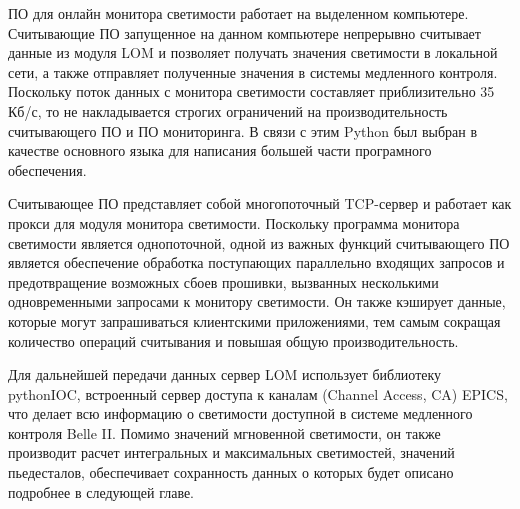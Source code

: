   ПО для онлайн монитора светимости работает на выделенном компьютере. Считывающие ПО запущенное на данном компьютере непрерывно считывает данные из модуля LOM и позволяет получать значения светимости в локальной сети, а также отправляет полученные значения в системы медленного контроля. Поскольку поток данных с монитора светимости составляет приблизительно 35 Кб/с, то не накладывается строгих ограничений на производительность считывающего ПО и ПО мониторинга. В связи с этим Python был выбран в качестве основного языка для написания большей части програмного обеспечения.\par
  Считывающее ПО представляет собой многопоточный TCP-сервер и работает как прокси для модуля монитора светимости. Поскольку программа монитора светимости является однопоточной, одной из важных функций считывающего ПО является обеспечение обработка поступающих параллельно входящих запросов и предотвращение возможных сбоев прошивки, вызванных несколькими одновременными запросами к монитору светимости. Он также кэширует данные, которые могут запрашиваться клиентскими приложениями, тем самым сокращая количество операций считывания и повышая общую производительность.\par
  Для дальнейшей передачи данных сервер LOM использует библиотеку pythonIOC, встроенный сервер доступа к каналам (Channel Access, CA) EPICS, что делает всю информацию о светимости доступной в системе медленного контроля Belle II. Помимо значений мгновенной светимости, он также производит расчет интегральных и максимальных светимостей, значений пьедесталов, обеспечивает сохранность данных о которых будет описано подробнее в следующей главе.
